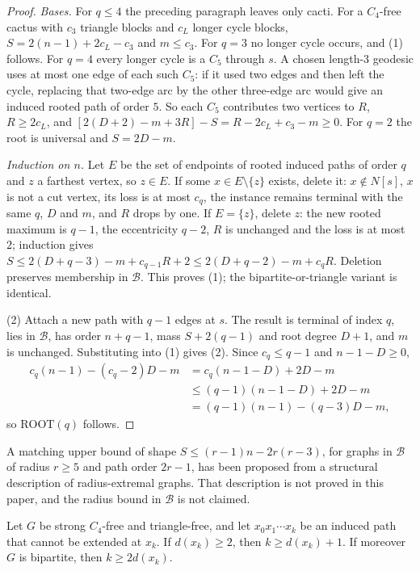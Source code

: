 \documentclass[ASNA]{USG}
\theoremstyle{WBstyletwo}
\numberwithin{equation}{section}
\newcommand{\ROOT}{\mathrm{ROOT}}
\begin{document}
\begin{proof}
\emph{Bases.} For $q\le 4$ the preceding paragraph leaves only cacti. For a $C_4$-free cactus with $c_3$ triangle blocks and $c_L$ longer cycle blocks, $S=2(n-1)+2c_L-c_3$ and $m\le c_3$. For $q=3$ no longer cycle occurs, and (1) follows. For $q=4$ every longer cycle is a $C_5$ through $s$. A chosen length-$3$ geodesic uses at most one edge of each such $C_5$: if it used two edges and then left the cycle, replacing that two-edge arc by the other three-edge arc would give an induced rooted path of order $5$. So each $C_5$ contributes two vertices to $R$, $R\ge 2c_L$, and $[2(D+2)-m+3R]-S=R-2c_L+c_3-m\ge 0$. For $q=2$ the root is universal and $S=2D-m$.

\emph{Induction on $n$.} Let $E$ be the set of endpoints of rooted induced paths of order $q$ and $z$ a farthest vertex, so $z\in E$. If some $x\in E\setminus\{z\}$ exists, delete it: $x\notin N[s]$, $x$ is not a cut vertex, its loss is at most $c_q$, the instance remains terminal with the same $q$, $D$ and $m$, and $R$ drops by one. If $E=\{z\}$, delete $z$: the new rooted maximum is $q-1$, the eccentricity $q-2$, $R$ is unchanged and the loss is at most $2$; induction gives $S\le 2(D+q-3)-m+c_{q-1}R+2\le 2(D+q-2)-m+c_q R$. Deletion preserves membership in $\mathcal B$. This proves (1); the bipartite-or-triangle variant is identical.

(2) Attach a new path with $q-1$ edges at $s$. The result is terminal of index $q$, lies in $\mathcal B$, has order $n+q-1$, mass $S+2(q-1)$ and root degree $D+1$, and $m$ is unchanged. Substituting into (1) gives (2). Since $c_q\le q-1$ and $n-1-D\ge 0$,
\begin{align*}
c_q(n-1)-(c_q-2)D-m
&=c_q(n-1-D)+2D-m\\
&\le(q-1)(n-1-D)+2D-m\\
&=(q-1)(n-1)-(q-3)D-m,
\end{align*}
so $\ROOT(q)$ follows.
\end{proof}

A matching upper bound of shape $S\le(r-1)n-2r(r-3)$, for graphs in $\mathcal B$ of radius $r\ge 5$ and path order $2r-1$, has been proposed from a structural description of radius-extremal graphs. That description is not proved in this paper, and the radius bound in $\mathcal B$ is not claimed.

\begin{lemma}\label{lem:blockers}
Let $G$ be strong $C_4$-free and triangle-free, and let $x_0x_1\cdots x_k$ be an induced path that cannot be extended at $x_k$. If $d(x_k)\ge 2$, then $k\ge d(x_k)+1$. If moreover $G$ is bipartite, then $k\ge 2d(x_k)$.
\end{lemma}
\end{document}

